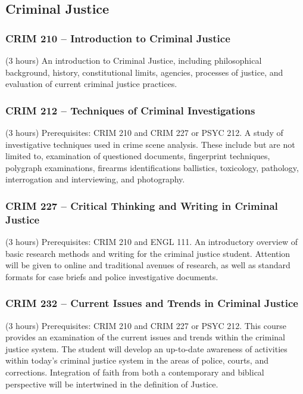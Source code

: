\subsection{Criminal Justice}

\subsubsection{CRIM 210 -- Introduction to Criminal Justice}%
\label{course:CRIM:210}
(3 hours) An introduction to Criminal Justice, including philosophical background, history, constitutional limits, agencies, processes of justice, and evaluation of current criminal justice practices.

\subsubsection{CRIM 212 -- Techniques of Criminal Investigations}%
\label{course:CRIM:212}
(3 hours) Prerequisites: CRIM 210 and CRIM 227 or PSYC 212. A study of investigative techniques used in crime scene analysis. These include but are not limited to, examination of questioned documents, fingerprint techniques, polygraph examinations, firearms identifications ballistics, toxicology, pathology, interrogation and interviewing, and photography. 

\subsubsection{CRIM 227 -- Critical Thinking and Writing in Criminal Justice}%
\label{course:CRIM:227}
(3 hours) Prerequisites: CRIM 210 and ENGL 111. An introductory overview of basic research methods and writing for the criminal justice student. Attention will be given to online and traditional avenues of research, as well as standard formats for case briefs and police investigative documents.

\subsubsection{CRIM 232 -- Current Issues and Trends in Criminal Justice}%
\label{course:CRIM:232}
(3 hours) Prerequisites: CRIM 210 and CRIM 227 or PSYC 212. This course provides an examination of the current issues and trends within the criminal justice system. The student will develop an up-to-date awareness of activities within today’s criminal justice system in the areas of police, courts, and corrections. Integration of faith from both a contemporary and biblical perspective will be intertwined in the definition of Justice.

